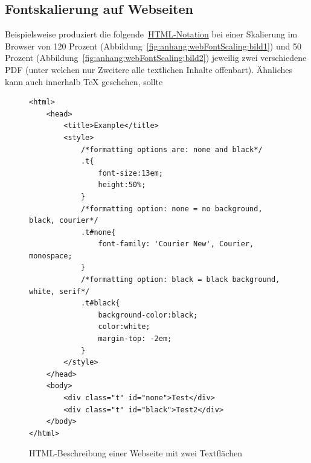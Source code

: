 \subsection{Fontskalierung auf Webseiten}\label{anhang:webFontScaling}
Beispielsweise produziert die folgende~\hyperref[fig:anhang:webFontScaling]{HTML-Notation} bei einer Skalierung im Browser von 120 Prozent (Abbildung~\ref{fig:anhang:webFontScaling:bild1}) und 50 Prozent (Abbildung~\ref{fig:anhang:webFontScaling:bild2}) jeweilig zwei verschiedene PDF (unter welchen nur Zweitere alle textlichen Inhalte offenbart). Ähnliches kann auch innerhalb \TeX{} geschehen, sollte 

\begin{figure}[h!]
\begin{Verbatim}[breaklines=true]
<html>
    <head>
        <title>Example</title>
        <style>
            /*formatting options are: none and black*/
            .t{
                font-size:13em;
                height:50%;
            }
            /*formatting option: none = no background, black, courier*/
            .t#none{
                font-family: 'Courier New', Courier, monospace;
            }
            /*formatting option: black = black background, white, serif*/
            .t#black{
                background-color:black;
                color:white;
                margin-top: -2em;
            }
        </style>
    </head>
    <body>
        <div class="t" id="none">Test</div>
        <div class="t" id="black">Test2</div>
    </body>
</html>
\end{Verbatim}
\caption{HTML-Beschreibung einer Webseite mit zwei Textflächen}
\label{fig:anhang:webFontScaling}
\end{figure}

\newpage

